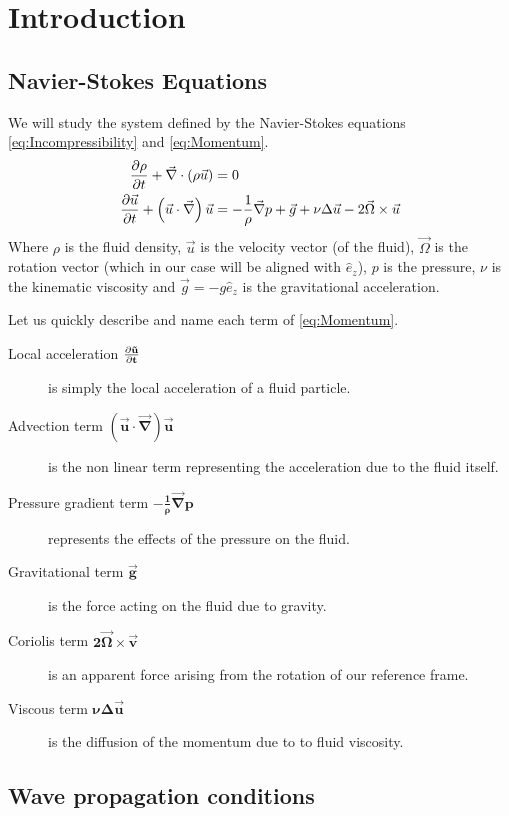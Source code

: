 \section{Introduction}
\subsection{Navier-Stokes Equations}

We will study the system defined by the Navier-Stokes equations \cref{eq:Incompressibility} and \cref{eq:Momentum}.  
\begin{align}
	\frac{\partial \rho}{\partial t} + \vec{\nabla} \cdot \left( \rho \vec{u} \right) & = 0 \label{eq:Incompressibility} \\
	\frac{\partial \vec{u}}{\partial t} + \left( \vec{u} \cdot \vec{\nabla} \right) \vec{u} & = - \frac{1}{\rho} \vec{\nabla} p +  \vec{g} + \nu \Delta \vec{u} - 2 \vec{\Omega} \times \vec{u} \label{eq:Momentum}
\end{align}
Where $\rho$ is the fluid density, $\vec{u}$ is the velocity vector (of the fluid), $\vec{\Omega}$ is the rotation vector (which in our case will be aligned with $\hat{e}_z$), $p$ is the pressure, $\nu$ is the kinematic viscosity and $\vec{g} = -g \hat{e}_z$ is the gravitational acceleration.

Let us quickly describe and name each term of \cref{eq:Momentum}.
\begin{description}
	\item[Local acceleration  $\mathbf{\frac{\partial \vec{u}}{\partial t}}$] is simply the local acceleration of a fluid particle.
	\item[Advection term $\mathbf{\left( \vec{u} \cdot \vec{\nabla} \right) \vec{u}}$] is the non linear term representing the acceleration due to the fluid itself.
	\item[Pressure gradient term $\mathbf{-\frac{1}{\rho} \vec{\nabla} p}$] represents the effects of the pressure on the fluid.
	\item[Gravitational term $\mathbf{\vec{g}}$] is the force acting on the fluid due to gravity.
	\item[Coriolis term $\mathbf{2 \vec{\Omega} \times \vec{v}}$] is an apparent force arising from the rotation of our reference frame.
	\item[Viscous term $\mathbf{\nu \Delta \vec{u}}$] is the diffusion of the momentum due to to fluid viscosity. 
\end{description}

\subsection{Wave propagation conditions}

